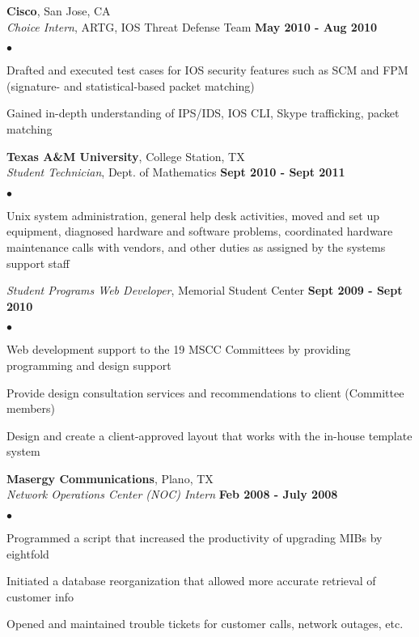 \documentclass[margin,line]{res}
\newenvironment{list2}{
  \begin{list}{$\bullet$}{%
      \setlength{\itemsep}{0in}
      \setlength{\parsep}{0in} \setlength{\parskip}{0in}
      \setlength{\topsep}{0in} \setlength{\partopsep}{0in} 
      \setlength{\leftmargin}{0.18in}}}{\end{list}}
\begin{document}
\begin{resume}
{\bf Cisco}, San Jose, CA \\
{\em Choice Intern}, ARTG, IOS Threat Defense Team \hfill {\bf May 2010 - Aug 2010}\\
\vspace{-3mm}
\begin{list2}
\item Drafted and executed test cases for IOS security features such as SCM and FPM
  (signature- and statistical-based packet matching)
\item Gained in-depth understanding of IPS/IDS, IOS CLI, Skype trafficking, packet matching
\end{list2}

{\bf Texas A\&M University}, College Station, TX \\
{\em Student Technician}, Dept. of Mathematics \hfill {\bf Sept 2010 - Sept 2011} \\
\vspace{-3mm}
\begin{list2}
\item Unix system administration, general help desk activities, moved and set up
  equipment, diagnosed hardware and software problems, coordinated hardware maintenance
  calls with vendors, and other duties as assigned by the systems support staff
\end{list2}

{\em Student Programs Web Developer}, Memorial Student Center \hfill {\bf Sept 2009 - Sept 2010} \\
\vspace{-3mm}
\begin{list2}
\item Web development support to the 19 MSCC Committees by providing programming and design support
\item Provide design consultation services and recommendations to client (Committee members)
\item Design and create a client-approved layout that works with the in-house template system
\end{list2}

{\bf Masergy Communications}, Plano, TX \\
{\em Network Operations Center (NOC) Intern} \hfill {\bf Feb 2008 - July 2008} \\
\vspace{-3mm}
\begin{list2}
\item Programmed a script that increased the productivity of upgrading MIBs by eightfold
\item Initiated a database reorganization that allowed more accurate retrieval of customer info
\item Opened and maintained trouble tickets for customer calls, network outages, etc.
\end{list2}


\end{resume}
\end{document}
